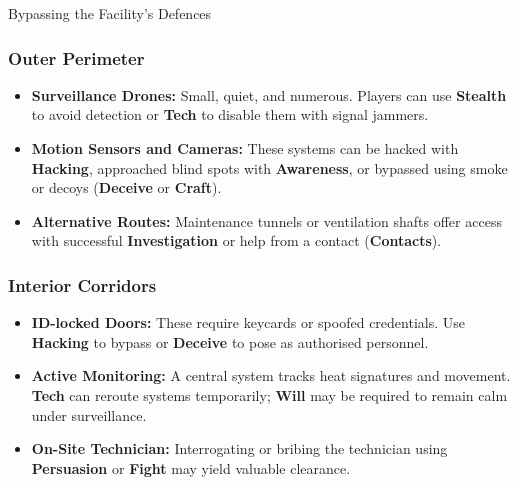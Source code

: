 \documentclass[nodeprecatedcode,bg=print]{dndbook}
\begin{document}
\begin{multicols}{2}
\begin{CommentBox}{Bypassing the Facility’s Defences}
    \vspace{0.5\baselineskip}
    
    \subsubsection*{Outer Perimeter}
    \begin{itemize}
        \item \textbf{Surveillance Drones:} Small, quiet, and numerous. Players can use \textbf{Stealth} to avoid detection or \textbf{Tech} to disable them with signal jammers.
        \item \textbf{Motion Sensors and Cameras:} These systems can be hacked with \textbf{Hacking}, approached blind spots with \textbf{Awareness}, or bypassed using smoke or decoys (\textbf{Deceive} or \textbf{Craft}).
        \item \textbf{Alternative Routes:} Maintenance tunnels or ventilation shafts offer access with successful \textbf{Investigation} or help from a contact (\textbf{Contacts}).
    \end{itemize}
    
    \vspace{0.5\baselineskip}
    
    \subsubsection*{Interior Corridors}
    \begin{itemize}
        \item \textbf{ID-locked Doors:} These require keycards or spoofed credentials. Use \textbf{Hacking} to bypass or \textbf{Deceive} to pose as authorised personnel.
        \item \textbf{Active Monitoring:} A central system tracks heat signatures and movement. \textbf{Tech} can reroute systems temporarily; \textbf{Will} may be required to remain calm under surveillance.
        \item \textbf{On-Site Technician:} Interrogating or bribing the technician using \textbf{Persuasion} or \textbf{Fight} may yield valuable clearance.
    \end{itemize}
    
    \vspace{0.5\baselineskip}
    

\end{CommentBox}
\end{multicols}
\end{document}
